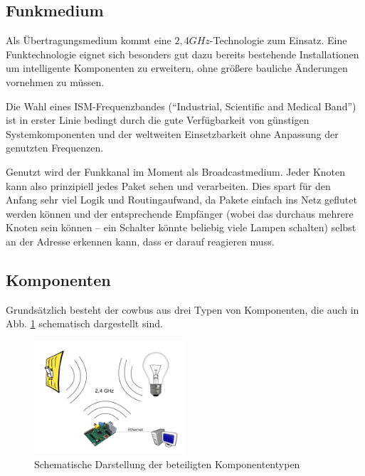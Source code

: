 \documentclass{IEEEtran}
\begin{document}
    \subsection{Funkmedium}
        Als Übertragungsmedium kommt eine $2,4GHz$-Technologie
        zum Einsatz. Eine Funktechnologie eignet sich besonders gut dazu
        bereits bestehende Installationen um intelligente Komponenten
        zu erweitern, ohne größere bauliche Änderungen vornehmen zu müssen.

        Die Wahl eines ISM-Frequenzbandes (\enquote{Industrial, Scientific and Medical Band})
        ist in erster Linie bedingt durch die gute Verfügbarkeit von günstigen
        Systemkomponenten und der weltweiten Einsetzbarkeit ohne Anpassung der
        genutzten Frequenzen.

        Genutzt wird der Funkkanal im Moment als Broadcastmedium.
        Jeder Knoten kann also prinzipiell jedes Paket sehen und verarbeiten.
        Dies spart für den Anfang sehr viel Logik und Routingaufwand,
        da Pakete einfach ins Netz geflutet werden können und der entsprechende
        Empfänger (wobei das durchaus mehrere Knoten sein können -- ein Schalter
        könnte beliebig viele Lampen schalten) selbst an der Adresse erkennen
        kann, dass er darauf reagieren muss.

    \subsection{Komponenten}
        Grundsätzlich besteht der cowbus aus drei Typen von Komponenten,
        die auch in Abb. \ref{fig:comp} schematisch dargestellt sind.

        \begin{figure}
            \centering
            \includegraphics[width=0.5\textwidth]{img/system}
            \caption{Schematische Darstellung der beteiligten Komponententypen}
            \label{fig:comp}
        \end{figure}
\end{document}
